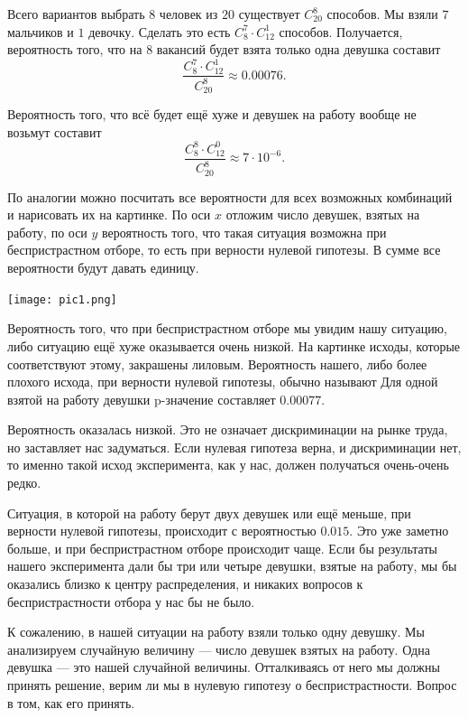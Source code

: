 \documentclass[12pt, a4paper, oneside]{article}
\begin{document}
Всего вариантов выбрать $8$ человек из $20$ существует $C_{20}^8$ способов. Мы взяли $7$ мальчиков и $1$ девочку. Сделать это есть $C_8^7 \cdot C_{12}^1$ способов. Получается, вероятность того, что на $8$ вакансий будет взята только одна девушка составит \[ \frac{C_8^7 \cdot C_{12}^1}{C_{20}^8} \approx 0.00076. \] 

Вероятность того, что всё будет ещё хуже и девушек на работу вообще не возьмут составит \[ \frac{C_8^8 \cdot C_{12}^0}{C_{20}^8} \approx 7 \cdot 10^{-6}. \] 

По аналогии можно посчитать все вероятности для всех возможных комбинаций и нарисовать их на картинке. По оси $x$ отложим число девушек, взятых на работу, по оси $y$ вероятность того, что такая ситуация возможна при беспристрастном отборе, то есть при верности нулевой гипотезы. В сумме все вероятности будут давать единицу. 

\begin{center} 
\texttt{[image: pic1.png]}
\end{center} 

Вероятность того, что при беспристрастном отборе мы увидим нашу ситуацию, либо ситуацию ещё хуже оказывается очень низкой. На картинке исходы, которые соответствуют этому, закрашены лиловым. Вероятность нашего, либо более плохого исхода, при верности нулевой гипотезы, обычно называют   Для одной взятой на работу девушки p-значение составляет $0.00077$.

Вероятность оказалась низкой. Это не означает дискриминации на рынке труда, но заставляет нас задуматься. Если нулевая гипотеза верна, и дискриминации нет, то именно такой исход эксперимента, как у нас, должен получаться очень-очень редко. 

Ситуация, в которой на работу берут двух девушек или ещё меньше, при верности нулевой гипотезы, происходит с вероятностью $0.015$. Это уже заметно больше, и при беспристрастном отборе происходит чаще. Если бы результаты нашего эксперимента дали бы три или четыре девушки, взятые на работу, мы бы оказались близко к центру распределения, и никаких вопросов к беспристрастности отбора у нас бы не было. 

К сожалению, в нашей ситуации на работу взяли только одну девушку. Мы анализируем случайную величину --- число девушек взятых на работу. Одна девушка --- это  нашей случайной величины. Отталкиваясь от него мы должны принять решение, верим ли мы в нулевую гипотезу о беспристрастности. Вопрос в том, как его принять. 
\end{document}
